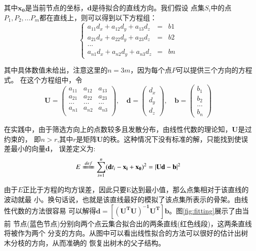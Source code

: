 其中$\mathbf{x_0}$是当前节点的坐标，$\mathbf{d}$是待拟合的直线方向。我们假设
点集$S_i$中的点$P_1,P_2,...P_m$都在直线上，则可以得到以下方程组：\\

\begin{equation} \label{eq:line}
	\left\{ 
		\begin{array}{lll}
			a_{11}d_x+a_{12}d_y+a_{13}d_z & = & b1\\
			a_{21}d_x+a_{22}d_y+a_{23}d_z & = & b2\\
			... & & \\
			a_{n1}d_x+a_{n2}d_y+a_{n3}d_z & = & bn
		\end{array}
	\right.
\end{equation}

其中具体数值未给出，注意这里的$n=3m$，因为每个点$P$可以提供三个方向的方程式。
在这个方程组中，令\\
\begin{displaymath}
	\mathbf{U}=
\left(
\begin{array}{ccc}
	a_{11} & a_{12} & a_{13}\\
	a_{21} & a_{22} & a_{23}\\
	... & ... & ...\\
	a_{n1} & a_{n2} & a_{n3}\\
\end{array}
\right)
,\quad
\mathbf{d}=
\left(
\begin{array}{c}
	d_x\\
	d_y\\
	d_z
\end{array}
\right)
,\quad
\mathbf{b}=
\left(
\begin{array}{c}
	b_1\\
	b_2\\
	...\\
	b_n
\end{array}
\right)
\end{displaymath}


在实践中，由于筛选方向上的点数较多且发散分布，由线性代数的理论知，$\mathbf{U}$是过约束的，
即$n>r$,其中$r$是矩阵$\mathbf{U}$的秩。这种情况下没有标准的解，只能找到使误差最小的向量$\mathbf{d}$，
误差定义为:\\
\begin{equation}
	E\xlongequal{def} \sum_{i=1}^n(\mathbf{d}t_i - \mathbf{x_i} + \mathbf{x_0})^2=|\mathbf{Ud}-\mathbf{b}|^2
\end{equation}

由于$E$正比于方程的均方误差，因此只要E达到最小值，那么点集相对于该直线的波动就最
小。换句话说，也就是该直线最好的模拟了该点集所表示的骨架。由线性代数的方法很容易
可以解得$\mathbf{d}=\mathbf{[(U^TU)^{-1}U^T]b}$。图\ref{fig:fitting}展示了由当前
节点(蓝色节点)分别向两个点云集合拟合出的两条直线(红色线段)，这两条直线将被作为两个
分支的方向。从图中可以看出线性拟合的方法可以很好的估计出树木分枝的方向，从而准确的
恢复出树木的父子结构。


